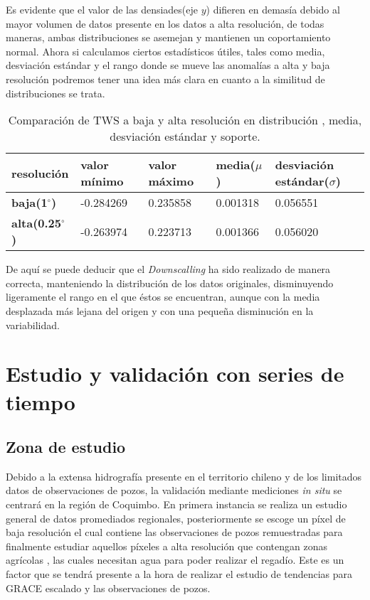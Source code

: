 Es evidente que el valor de las densiades(eje $y$) difieren en demasía debido al mayor volumen de datos presente en los datos a alta resolución, de todas maneras, ambas distribuciones
se asemejan y mantienen un coportamiento normal. Ahora si calculamos ciertos estadísticos útiles, tales como media, desviación estándar y el rango donde se mueve las anomalías a alta y baja resolución podremos tener una idea más clara 
en cuanto a la similitud de distribuciones se trata.

\begin{table}[H] 
    \caption[Comparación de distribuciones de TWS a baja y alta resolución]{Comparación de TWS a baja y alta resolución en distribución , media, desviación estándar y soporte.}
    \begin{tabularx}{0.9\textwidth}{CCCCC}
    \toprule
    \textbf{resolución}	& \textbf{valor mínimo}	& \textbf{valor máximo} & \textbf{media($\mu$)} & \textbf{desviación estándar($\sigma$)}\\
        \midrule
        \textbf{baja(1$^{\circ}$)}		& -0.284269 & 0.235858 & 0.001318 & 0.056551\\
        \textbf{alta(0.25$^{\circ}$)}   & -0.263974 & 0.223713	& 0.001366 & 0.056020\\
        \bottomrule
    \end{tabularx}
\end{table}

De aquí se puede deducir que el \textit{Downscalling} ha sido realizado de manera correcta, manteniendo la distribución de los datos originales, disminuyendo ligeramente el rango en el que éstos se encuentran,
aunque con la media desplazada más lejana del origen y con una pequeña disminución en la variabilidad.


%
%
%
%


\section{Estudio y validación con series de tiempo}

\subsection{Zona de estudio}

Debido a la extensa hidrografía presente en el territorio chileno y de los limitados datos de observaciones de pozos, la validación mediante mediciones \textit{in situ} se centrará
en la región de Coquimbo. En primera instancia se realiza un estudio general de datos promediados regionales, 
posteriormente se escoge un píxel de baja resolución el cual contiene las observaciones de pozos remuestradas para finalmente estudiar aquellos píxeles a alta resolución que contengan zonas agrícolas \cite{LC}, las cuales necesitan agua para 
poder realizar el regadío. Este es un factor que se tendrá presente a la hora de realizar el estudio de tendencias para GRACE escalado y las observaciones de pozos.

